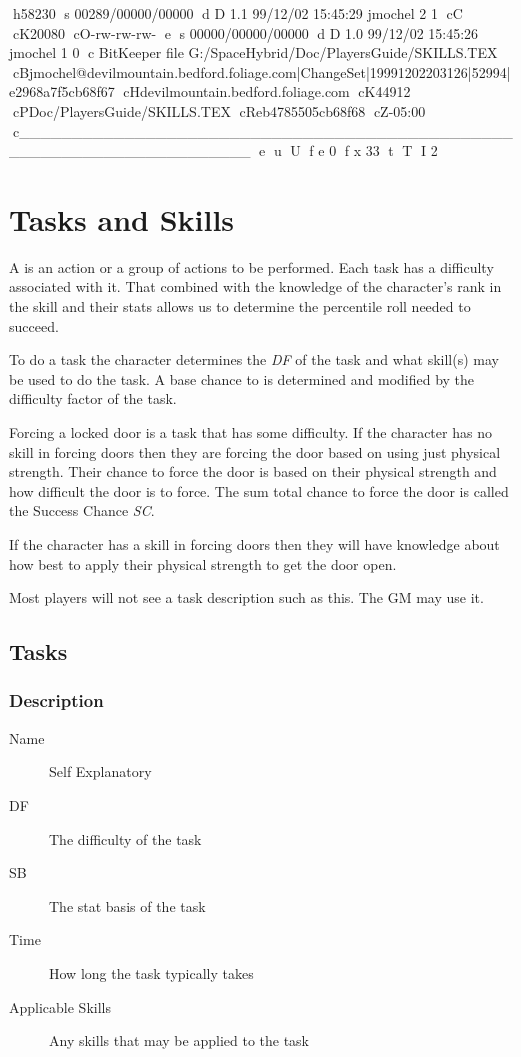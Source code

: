 h58230
s 00289/00000/00000
d D 1.1 99/12/02 15:45:29 jmochel 2 1
cC
cK20080
cO-rw-rw-rw-
e
s 00000/00000/00000
d D 1.0 99/12/02 15:45:26 jmochel 1 0
c BitKeeper file G:/SpaceHybrid/Doc/PlayersGuide/SKILLS.TEX
cBjmochel@devilmountain.bedford.foliage.com|ChangeSet|19991202203126|52994|e2968a7f5cb68f67
cHdevilmountain.bedford.foliage.com
cK44912
cPDoc/PlayersGuide/SKILLS.TEX
cReb4785505cb68f68
cZ-05:00
c______________________________________________________________________
e
u
U
f e 0
f x 33
t
T
I 2
\chapter{Tasks and Skills}

A  is an action or a group of actions to be performed. Each task has a 
difficulty associated with it. That combined with the knowledge of the character's 
rank in the skill and their stats allows us to determine the percentile roll needed 
to succeed.

To do a task the character determines the  {\em DF} of the 
task and what skill(s) may be used to do the task. A base chance to 
{\em {}} is determined and modified by the difficulty factor 
of the task. 

Forcing a locked door is a task that has some difficulty. If the 
character has no skill in forcing doors then they are forcing the 
door based on using just physical strength. Their chance to force the 
door is based on their physical strength and how difficult the door 
is to force. The sum total chance to force the door is called the Success Chance {\em SC}.

If the character has a skill in forcing doors then they will have 
knowledge about how best to apply their physical strength to get the 
door open. 

Most players will not see a task description such as this. The GM may use
it.

\section{Tasks}

\subsection{Description}

\begin{description}
	\item[Name] 
	Self Explanatory
	\item[DF] The difficulty of the task
	\item[SB] The stat basis of the task
	\item[Time]
    How long the task typically takes
    \item[Applicable Skills]
    Any skills that may be applied to the task
\end{description}


